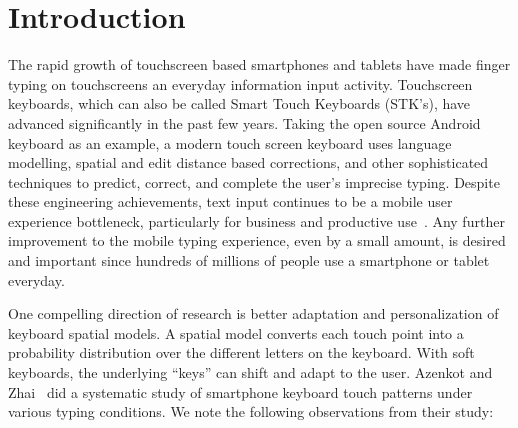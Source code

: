 \documentclass{sigchi}
\begin{document}


\section{Introduction}
The rapid growth of touchscreen based smartphones and tablets have made finger typing on touchscreens an everyday information input activity. Touchscreen keyboards, which can also be called Smart Touch Keyboards (STK’s), have advanced significantly in the past few years. Taking the open source Android keyboard as an example, a modern touch screen keyboard uses language modelling, spatial and edit distance based corrections, and other sophisticated techniques to predict, correct, and complete the user’s imprecise typing. Despite these engineering achievements, text input continues to be a mobile user experience bottleneck, particularly for business and productive use~\cite{Bao:2011}. Any further improvement to the mobile typing experience, even by a small amount, is desired and important since hundreds of millions of people use a smartphone or tablet everyday.

One compelling direction of research is better adaptation and personalization of keyboard spatial models. A spatial model converts each touch point into a probability distribution over the different letters on the keyboard. With soft keyboards, the underlying ``keys'' can shift and adapt to the user. Azenkot and Zhai~\cite{Azenkot:2012} did a systematic study of smartphone keyboard touch patterns under various typing conditions. We note the following observations from their study:
\end{document}
